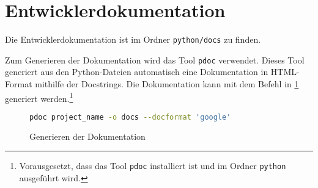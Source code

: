 \section{Entwicklerdokumentation}
\label{sec:entwicklerdokumentation}

Die Entwicklerdokumentation ist im Ordner \texttt{python/docs} zu finden.

Zum Generieren der Dokumentation wird das Tool \texttt{pdoc} verwendet.
Dieses Tool generiert aus den Python-Dateien automatisch eine Dokumentation in HTML-Format mithilfe der Docstrings.
Die Dokumentation kann mit dem Befehl in \ref{lst:generate_documentation} generiert werden.\footnote{Vorausgesetzt, dass das Tool \texttt{pdoc} installiert ist und im Ordner \texttt{python} ausgeführt wird.}

\begin{figure}[H]
    \centering
    \begin{lstlisting}[language=bash] 
        pdoc project_name -o docs --docformat 'google'
    \end{lstlisting}
    \caption{Generieren der Dokumentation}
    \label{lst:generate_documentation}
\end{figure}